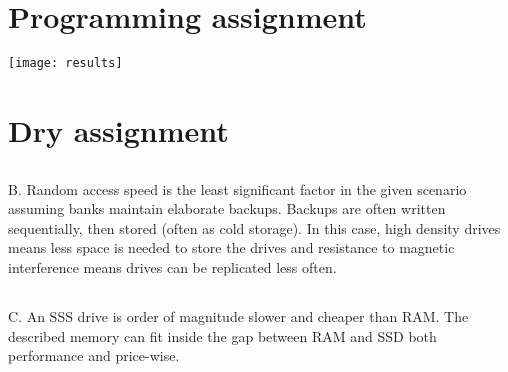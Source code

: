 \documentclass[12pt,a4paper]{article}
\begin{document}
\section{Programming assignment}
\texttt{[image: results]}
\section{Dry assignment}
\subsection{}
B. Random access speed is the least significant factor in the given scenario assuming banks maintain elaborate backups. Backups are often written sequentially, then stored (often as cold storage). In this case, high density drives means less space is needed to store the drives and resistance to magnetic interference means drives can be replicated less often.
\subsection{}
C. An SSS drive is order of magnitude slower and cheaper than RAM. The described memory can fit inside the gap between RAM and SSD both performance and price-wise.
\end{document}
